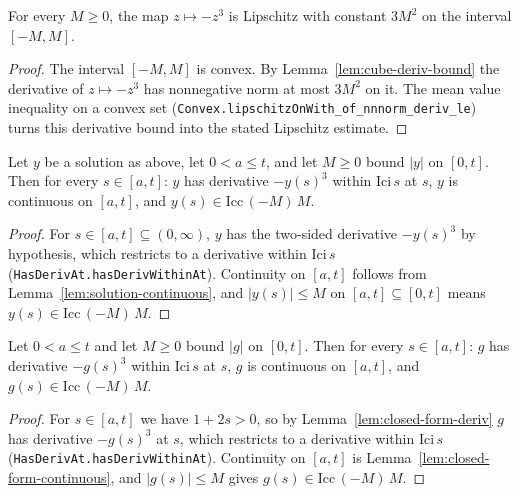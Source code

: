 \begin{lemma}
    \label{lem:cube-lipschitz}
    \leanok
    For every $M \ge 0$, the map $z \mapsto -z^3$ is Lipschitz with constant
    $3M^2$ on the interval $[-M, M]$.
\end{lemma}
\begin{proof}
    The interval $[-M,M]$ is convex. By Lemma~\ref{lem:cube-deriv-bound} the
    derivative of $z \mapsto -z^3$ has nonnegative norm at most $3M^2$ on it. The
    mean value inequality on a convex set
    (\texttt{Convex.lipschitzOnWith\_of\_nnnorm\_deriv\_le}) turns this derivative
    bound into the stated Lipschitz estimate.
\end{proof}

\begin{lemma}
    \label{lem:solution-traj}
    \leanok
    Let $y$ be a solution as above, let $0 < a \le t$, and let $M \ge 0$ bound
    $|y|$ on $[0,t]$. Then for every $s \in [a,t]$: $y$ has derivative $-y(s)^3$
    within $\mathrm{Ici}\,s$ at $s$, $y$ is continuous on $[a,t]$, and
    $y(s) \in \mathrm{Icc}\,(-M)\,M$.
\end{lemma}
\begin{proof}
    For $s \in [a,t] \subseteq (0,\infty)$, $y$ has the two-sided derivative
    $-y(s)^3$ by hypothesis, which restricts to a derivative within
    $\mathrm{Ici}\,s$ (\texttt{HasDerivAt.hasDerivWithinAt}). Continuity on
    $[a,t]$ follows from Lemma~\ref{lem:solution-continuous}, and $|y(s)| \le M$
    on $[a,t] \subseteq [0,t]$ means $y(s) \in \mathrm{Icc}\,(-M)\,M$.
\end{proof}

\begin{lemma}
    \label{lem:closed-form-traj}
    \leanok
    Let $0 < a \le t$ and let $M \ge 0$ bound $|g|$ on $[0,t]$. Then for every
    $s \in [a,t]$: $g$ has derivative $-g(s)^3$ within $\mathrm{Ici}\,s$ at $s$,
    $g$ is continuous on $[a,t]$, and $g(s) \in \mathrm{Icc}\,(-M)\,M$.
\end{lemma}
\begin{proof}
    For $s \in [a,t]$ we have $1 + 2s > 0$, so by
    Lemma~\ref{lem:closed-form-deriv} $g$ has derivative $-g(s)^3$ at $s$, which
    restricts to a derivative within $\mathrm{Ici}\,s$
    (\texttt{HasDerivAt.hasDerivWithinAt}). Continuity on $[a,t]$ is
    Lemma~\ref{lem:closed-form-continuous}, and $|g(s)| \le M$ gives
    $g(s) \in \mathrm{Icc}\,(-M)\,M$.
\end{proof}

